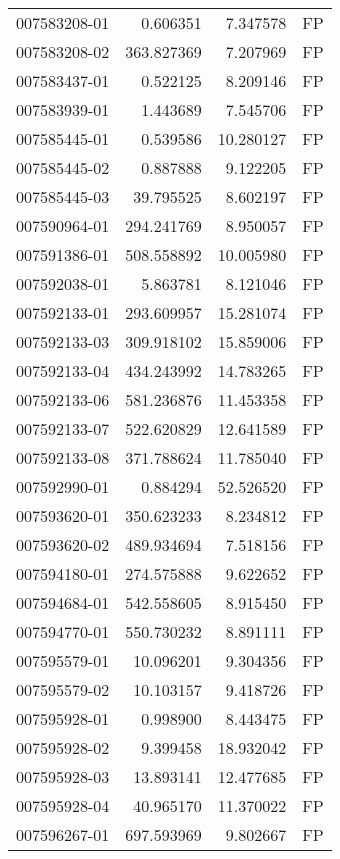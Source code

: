 \begin{tabular}{lrrl}
007583208-01 &    0.606351 &     7.347578 &   FP \\
007583208-02 &  363.827369 &     7.207969 &   FP \\
007583437-01 &    0.522125 &     8.209146 &   FP \\
007583939-01 &    1.443689 &     7.545706 &   FP \\
007585445-01 &    0.539586 &    10.280127 &   FP \\
007585445-02 &    0.887888 &     9.122205 &   FP \\
007585445-03 &   39.795525 &     8.602197 &   FP \\
007590964-01 &  294.241769 &     8.950057 &   FP \\
007591386-01 &  508.558892 &    10.005980 &   FP \\
007592038-01 &    5.863781 &     8.121046 &   FP \\
007592133-01 &  293.609957 &    15.281074 &   FP \\
007592133-03 &  309.918102 &    15.859006 &   FP \\
007592133-04 &  434.243992 &    14.783265 &   FP \\
007592133-06 &  581.236876 &    11.453358 &   FP \\
007592133-07 &  522.620829 &    12.641589 &   FP \\
007592133-08 &  371.788624 &    11.785040 &   FP \\
007592990-01 &    0.884294 &    52.526520 &   FP \\
007593620-01 &  350.623233 &     8.234812 &   FP \\
007593620-02 &  489.934694 &     7.518156 &   FP \\
007594180-01 &  274.575888 &     9.622652 &   FP \\
007594684-01 &  542.558605 &     8.915450 &   FP \\
007594770-01 &  550.730232 &     8.891111 &   FP \\
007595579-01 &   10.096201 &     9.304356 &   FP \\
007595579-02 &   10.103157 &     9.418726 &   FP \\
007595928-01 &    0.998900 &     8.443475 &   FP \\
007595928-02 &    9.399458 &    18.932042 &   FP \\
007595928-03 &   13.893141 &    12.477685 &   FP \\
007595928-04 &   40.965170 &    11.370022 &   FP \\
007596267-01 &  697.593969 &     9.802667 &   FP \\

\end{tabular}
